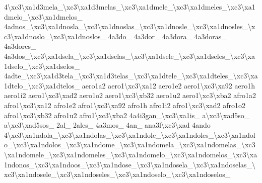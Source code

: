 {4\textbackslash{}xc3\textbackslash{}xa1d3mela\-\_\textbackslash{}xc3\textbackslash{}xa1d3melas\-\_\textbackslash{}xc3\textbackslash{}xa1dmele\-\_\textbackslash{}xc3\textbackslash{}xa1dmeles\-\_\textbackslash{}xc3\textbackslash{}xa1dmelo\-\_\textbackslash{}xc3\textbackslash{}xa1dmelos\-\_\- 4adnos\-\_\textbackslash{}xc3\textbackslash{}xa1dnosla\-\_\textbackslash{}xc3\textbackslash{}xa1dnoslas\-\_\textbackslash{}xc3\textbackslash{}xa1dnosle\-\_\textbackslash{}xc3\textbackslash{}xa1dnosles\-\_\textbackslash{}xc3\textbackslash{}xa1dnoslo\-\_\textbackslash{}xc3\textbackslash{}xa1dnoslos\-\_\- 4a3do\-\_\- 4a3dor\-\_\- 4a3dora\-\_\- 4a3doras\-\_\- 4a3dores\-\_\- 4a3dos\-\_\textbackslash{}xc3\textbackslash{}xa1dsela\-\_\textbackslash{}xc3\textbackslash{}xa1dselas\-\_\textbackslash{}xc3\textbackslash{}xa1dsele\-\_\textbackslash{}xc3\textbackslash{}xa1dseles\-\_\textbackslash{}xc3\textbackslash{}xa1dselo\-\_\textbackslash{}xc3\textbackslash{}xa1dselos\-\_\- 4adte\-\_\textbackslash{}xc3\textbackslash{}xa1d3tela\-\_\textbackslash{}xc3\textbackslash{}xa1d3telas\-\_\textbackslash{}xc3\textbackslash{}xa1dtele\-\_\textbackslash{}xc3\textbackslash{}xa1dteles\-\_\textbackslash{}xc3\textbackslash{}xa1dtelo\-\_\textbackslash{}xc3\textbackslash{}xa1dtelos\-\_\- aero1a2 aero1\textbackslash{}xc3\textbackslash{}xa12 aero1e2 aero1\textbackslash{}xc3\textbackslash{}xa92 aero1h aero1i2 aero1\textbackslash{}xc3\textbackslash{}xad2 aero1o2 aero1\textbackslash{}xc3\textbackslash{}xb32 aero1u2 aero1\textbackslash{}xc3\textbackslash{}xba2 afro1a2 afro1\textbackslash{}xc3\textbackslash{}xa12 afro1e2 afro1\textbackslash{}xc3\textbackslash{}xa92 afro1h afro1i2 afro1\textbackslash{}xc3\textbackslash{}xad2 afro1o2 afro1\textbackslash{}xc3\textbackslash{}xb32 afro1u2 afro1\textbackslash{}xc3\textbackslash{}xba2 4a4i3gan\-\_\textbackslash{}xc3\textbackslash{}xa1is\-\_\- a\textbackslash{}xc3\textbackslash{}xad5so\-\_\- a\textbackslash{}xc3\textbackslash{}xad5sos\-\_\- 2al\-\_\- 2ales\-\_\- 4a3mos\-\_\- 4an\-\_\- ana3l\textbackslash{}xc3\textbackslash{}xad 4ando 4\textbackslash{}xc3\textbackslash{}xa1ndola\-\_\textbackslash{}xc3\textbackslash{}xa1ndolas\-\_\textbackslash{}xc3\textbackslash{}xa1ndole\-\_\textbackslash{}xc3\textbackslash{}xa1ndoles\-\_\textbackslash{}xc3\textbackslash{}xa1ndolo\-\_\textbackslash{}xc3\textbackslash{}xa1ndolos\-\_\textbackslash{}xc3\textbackslash{}xa1ndome\-\_\textbackslash{}xc3\textbackslash{}xa1ndomela\-\_\textbackslash{}xc3\textbackslash{}xa1ndomelas\-\_\textbackslash{}xc3\textbackslash{}xa1ndomele\-\_\textbackslash{}xc3\textbackslash{}xa1ndomeles\-\_\textbackslash{}xc3\textbackslash{}xa1ndomelo\-\_\textbackslash{}xc3\textbackslash{}xa1ndomelos\-\_\textbackslash{}xc3\textbackslash{}xa1ndonos\-\_\textbackslash{}xc3\textbackslash{}xa1ndoos\-\_\textbackslash{}xc3\textbackslash{}xa1ndose\-\_\textbackslash{}xc3\textbackslash{}xa1ndosela\-\_\textbackslash{}xc3\textbackslash{}xa1ndoselas\-\_\textbackslash{}xc3\textbackslash{}xa1ndosele\-\_\textbackslash{}xc3\textbackslash{}xa1ndoseles\-\_\textbackslash{}xc3\textbackslash{}xa1ndoselo\-\_\textbackslash{}xc3\textbackslash{}xa1ndoselos\-\_\- }
